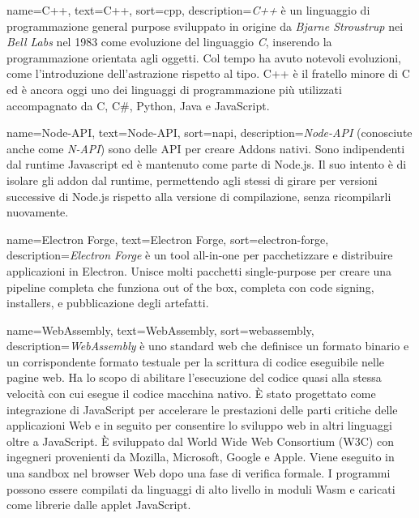  {
    name=C++,
    text=C++,
    sort=cpp,
    description={\emph{C++} è un linguaggio di programmazione general purpose sviluppato in origine da \emph{Bjarne Stroustrup} nei \emph{Bell Labs} nel 1983 come evoluzione del linguaggio \emph{C}, inserendo la programmazione orientata agli oggetti. Col tempo ha avuto notevoli evoluzioni, come l'introduzione dell'astrazione rispetto al tipo.
    C++ è il fratello minore di C ed è ancora oggi uno dei linguaggi di programmazione più utilizzati accompagnato da C, C#, Python, Java e JavaScript.}
}

 {
    name=Node-API,
    text=Node-API,
    sort=napi,
    description={\emph{Node-API} (conosciute anche come \emph{N-API}) sono delle API per creare Addons nativi. Sono indipendenti dal runtime Javascript ed è mantenuto come parte di Node.js. Il suo intento è di isolare gli addon dal runtime, permettendo agli stessi di girare per versioni successive di Node.js rispetto alla versione di compilazione, senza ricompilarli nuovamente.}
}

 {
    name=Electron Forge,
    text=Electron Forge,
    sort=electron-forge,
    description={\emph{Electron Forge} è un tool all-in-one per pacchetizzare e distribuire applicazioni in Electron. Unisce molti pacchetti single-purpose per creare una pipeline completa che funziona out of the box, completa con code signing, installers, e pubblicazione degli artefatti.}
}

 {
    name=WebAssembly,
    text=WebAssembly,
    sort=webassembly,
    description={\emph{WebAssembly} è uno standard web che definisce un formato binario e un corrispondente formato testuale per la scrittura di codice eseguibile nelle pagine web. Ha lo scopo di abilitare l'esecuzione del codice quasi alla stessa velocità con cui esegue il codice macchina nativo. È stato progettato come integrazione di JavaScript per accelerare le prestazioni delle parti critiche delle applicazioni Web e in seguito per consentire lo sviluppo web in altri linguaggi oltre a JavaScript. È sviluppato dal World Wide Web Consortium (W3C) con ingegneri provenienti da Mozilla, Microsoft, Google e Apple. Viene eseguito in una sandbox nel browser Web dopo una fase di verifica formale. I programmi possono essere compilati da linguaggi di alto livello in moduli Wasm e caricati come librerie dalle applet JavaScript.}
}